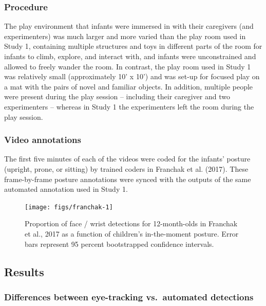 \documentclass[english,man]{apa6}
\begin{document}
\subsubsection{Procedure}\label{procedure-1}

The play environment that infants were immersed in with their caregivers
(and experimenters) was much larger and more varied than the play room
used in Study 1, containing multiple structures and toys in different
parts of the room for infants to climb, explore, and interact with, and
infants were unconstrained and allowed to freely wander the room. In
contrast, the play room used in Study 1 was relatively small
(approximately 10' x 10') and was set-up for focused play on a mat with
the pairs of novel and familiar objects. In addition, multiple people
were present during the play session -- including their caregiver and
two experimenters -- whereas in Study 1 the experimenters left the room
during the play session.

\subsubsection{Video annotations}\label{video-annotations}

The first five minutes of each of the videos were coded for the infants'
posture (upright, prone, or sitting) by trained coders in Franchak et
al. (2017). These frame-by-frame posture annotations were synced with
the outputs of the same automated annotation used in Study 1.

\begin{figure}[H]

{\centering \texttt{[image: figs/franchak-1]} 

}

\caption{Proportion of face / wrist detections for 12-month-olds in Franchak et al., 2017 as a function of children's in-the-moment posture. Error bars represent 95 percent bootstrapped confidence intervals.}\label{fig:franchak}
\end{figure}

\subsection{Results}\label{results-1}

\subsubsection{Differences between eye-tracking vs.~automated
detections}\label{differences-between-eye-tracking-vs.automated-detections}
\end{document}
